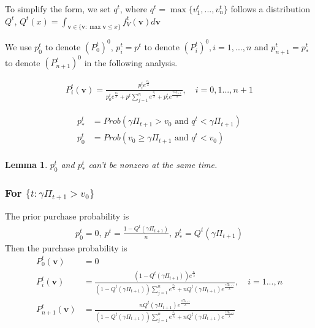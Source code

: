 \documentclass[11pt,a4paper]{article}
\newtheorem{lemma}{Lemma}
\begin{document}
To simplify the form, we set $q^t$, where $q^t=\max\{v^t_1,...,v^t_n\}$ follows a distribution $Q^t$, $Q^t(x)=\int_{\textbf{v}\in\{\textbf{v}:\max \textbf{v}\leq x\}}f^t_V(\textbf{v})d\textbf{v}$

We use $p^t_0$ to denote $(P_0^t)^0$, $p_i^t=p^t$ to denote $(P_i^t)^0, i=1,...,n$ and $p_{n+1}^t=p^t_*$ to denote $(P_{n+1}^t)^0$ in the following analysis.

\begin{equation}
    \begin{aligned}
        P^t_i(\mathbf{v})=\frac{p_i^te^{\frac{v_0}{\lambda}}}{p_0^te^{\frac{v_0}{\lambda}}+p^t\sum_{j=1}^{n}e^{\frac{v_j}{\lambda}}+p_*^te^{\frac{\gamma\Pi_{t+1}}{\lambda}}},\quad i=0,1...,n+1
    \end{aligned}
    \nonumber
\end{equation}

\begin{equation}
    \begin{aligned}
        p_*^t&=Prob(\gamma\Pi_{t+1}>v_0\text{ and }q^t<\gamma\Pi_{t+1})\\
        p_0^t&=Prob(v_0\geq \gamma\Pi_{t+1}\text{ and }q^t<v_0)\\
    \end{aligned}
    \nonumber
\end{equation}
\begin{lemma}
    $p_0^t$ and $p_*^t$ can't be nonzero at the same time.
\end{lemma}

\subsubsection*{For $\{t:\gamma\Pi_{t+1}>v_0\}$}
The prior purchase probability is
\begin{equation}
    \begin{aligned}
        p_0^t=0,\  p^t=\frac{1-Q^t(\gamma\Pi_{t+1})}{n},\ p_*^t=Q^t(\gamma\Pi_{t+1})
    \end{aligned}
    \nonumber
\end{equation}
Then the purchase probability is
\begin{equation}
    \begin{aligned}
        P^t_0(\mathbf{v})&=0\\
        P^t_i(\mathbf{v})&=\frac{(1-Q^t(\gamma\Pi_{t+1}))e^{\frac{v_i}{\lambda}}}{(1-Q^t(\gamma\Pi_{t+1}))\sum_{j=1}^{n}e^{\frac{v_j}{\lambda}}+nQ^t(\gamma\Pi_{t+1})e^{\frac{\gamma\Pi_{t+1}}{\lambda}}},\quad i=1...,n\\
        P^t_{n+1}(\mathbf{v})&=\frac{nQ^t(\gamma\Pi_{t+1})e^{\frac{\gamma\Pi_{t+1}}{\lambda}}}{(1-Q^t(\gamma\Pi_{t+1}))\sum_{j=1}^{n}e^{\frac{v_j}{\lambda}}+nQ^t(\gamma\Pi_{t+1})e^{\frac{\gamma\Pi_{t+1}}{\lambda}}}
    \end{aligned}
    \nonumber
\end{equation}
\end{document}
